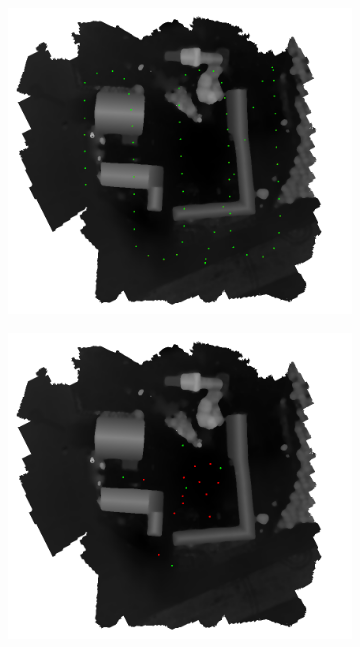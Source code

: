 \begin{figure}
        \begin{subfigure}[b]{0.33\textwidth}
                \includegraphics[width=\linewidth]{FIGS/TaskCorrel/Viabon/Protocol_Acquisition_2.png}
        \end{subfigure}%
        	\hfill
        \begin{subfigure}[b]{0.33\textwidth}
                \includegraphics[width=\linewidth]{FIGS/TaskCorrel/Viabon/PtsTerrainDistribution_2.png}

\end{subfigure}
\end{figure}
